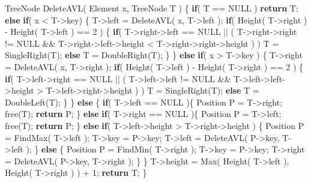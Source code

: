 \documentclass[]{article}
\newenvironment{Shaded}{}{}
\newcommand{\DecValTok}[1]{\textcolor[rgb]{0.25,0.63,0.44}{#1}}
\newcommand{\ControlFlowTok}[1]{\textcolor[rgb]{0.00,0.44,0.13}{\textbf{#1}}}
\newcommand{\NormalTok}[1]{#1}
\begin{document}
\begin{Shaded}
\begin{Highlighting}[]
\NormalTok{TreeNode DeleteAVL( Element x, TreeNode T )}
\NormalTok{\{}
    \ControlFlowTok{if}\NormalTok{( T == NULL )}
        \ControlFlowTok{return}\NormalTok{ T;}
    \ControlFlowTok{else} \ControlFlowTok{if}\NormalTok{( x < T->key)}
\NormalTok{        \{}
\NormalTok{            T->left = DeleteAVL( x, T->left );}
            \ControlFlowTok{if}\NormalTok{( Height( T->right ) - Height( T->left ) == }\DecValTok{2}\NormalTok{ )}
\NormalTok{            \{}
                \ControlFlowTok{if}\NormalTok{( T->right->left == NULL || ( T->right->right != NULL && T->right->left->height < T->right->right->height ) ) }
\NormalTok{                    T = SingleRight(T);}
                \ControlFlowTok{else}\NormalTok{ T = DoubleRight(T); }
\NormalTok{            \}}
\NormalTok{        \}}
        \ControlFlowTok{else} \ControlFlowTok{if}\NormalTok{( x > T->key )}
\NormalTok{            \{}
\NormalTok{                T->right = DeleteAVL( x, T->right );}
                \ControlFlowTok{if}\NormalTok{( Height( T->left ) - Height( T->right ) == }\DecValTok{2}\NormalTok{ )}
\NormalTok{                \{}
                    \ControlFlowTok{if}\NormalTok{( T->left->right == NULL || ( T->left->left != NULL && T->left->left->height > T->left->right->height ) ) }
\NormalTok{                        T = SingleRight(T);}
                    \ControlFlowTok{else}
\NormalTok{                        T = DoubleLeft(T); }
\NormalTok{                \}}
\NormalTok{            \}}
        \ControlFlowTok{else} 
\NormalTok{            \{}
                \ControlFlowTok{if}\NormalTok{( T->left == NULL )\{}
\NormalTok{                    Position P = T->right;}
\NormalTok{                    free(T);}
                    \ControlFlowTok{return}\NormalTok{ P;}
\NormalTok{                \}}
                \ControlFlowTok{else} \ControlFlowTok{if}\NormalTok{( T->right == NULL )\{}
\NormalTok{                    Position P = T->left;}
\NormalTok{                    free(T);}
                    \ControlFlowTok{return}\NormalTok{ P;}
\NormalTok{                \}}
                \ControlFlowTok{else} \ControlFlowTok{if}\NormalTok{( T->left->height > T->right->height )}
\NormalTok{                \{}
\NormalTok{                    Position P = FindMax( T->left );}
\NormalTok{                    T->key = P->key;}
\NormalTok{                    T->left = DeleteAVL( P->key, T->left );}
\NormalTok{                \}}
                \ControlFlowTok{else}
\NormalTok{                \{}
\NormalTok{                    Position P = FindMin( T->right );}
\NormalTok{                    T->key = P->key;}
\NormalTok{                    T->right = DeleteAVL( P->key, T->right );}
\NormalTok{                \}}
\NormalTok{            \}}
\NormalTok{    T->height = Max( Height( T->left ), Height( T->right ) ) + }\DecValTok{1}\NormalTok{;}
    \ControlFlowTok{return}\NormalTok{ T;}
\NormalTok{\}}
\end{Highlighting}
\end{Shaded}
\end{document}
